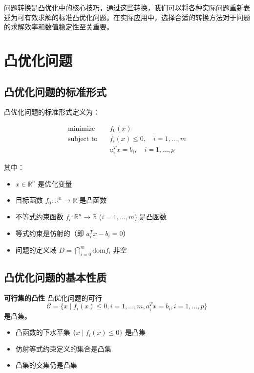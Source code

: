 \documentclass[12pt,a4paper]{book}
\begin{document}
问题转换是凸优化中的核心技巧，通过这些转换，我们可以将各种实际问题重新表述为可有效求解的标准凸优化问题。在实际应用中，选择合适的转换方法对于问题的求解效率和数值稳定性至关重要。

\section{凸优化问题}

\subsection{凸优化问题的标准形式}

凸优化问题的标准形式定义为：

\begin{equation}
\begin{aligned}
\text{minimize} \quad & f_0(x) \\
\text{subject to} \quad & f_i(x) \leq 0, \quad i = 1, \dots, m \\
& a_i^T x = b_i, \quad i = 1, \dots, p
\end{aligned}
\label{eq:convex_opt_standard}
\end{equation}

其中：
\begin{itemize}
    \item $x \in \mathbb{R}^n$ 是优化变量
    \item 目标函数 $f_0: \mathbb{R}^n \to \mathbb{R}$ 是凸函数
    \item 不等式约束函数 $f_i: \mathbb{R}^n \to \mathbb{R}$ ($i=1,\dots,m$) 是凸函数
    \item 等式约束是仿射的（即 $a_i^T x - b_i = 0$）
    \item 问题的定义域 $D = \bigcap_{i=0}^m \text{dom} f_i$ 非空
\end{itemize}

\subsection{凸优化问题的基本性质}

\textbf{可行集的凸性}
凸优化问题的可行
\[
\mathcal{C} = \{x \mid f_i(x) \leq 0, i=1,\dots,m, a_i^T x = b_i, i=1,\dots,p\}
\]
是凸集。

\begin{itemize}
    \item 凸函数的下水平集 $\{x \mid f_i(x) \leq 0\}$ 是凸集
    \item 仿射等式约束定义的集合是凸集
    \item 凸集的交集仍是凸集
\end{itemize}
\end{document}
